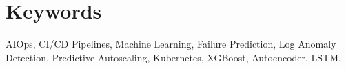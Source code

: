 \chapter*{Keywords}
AIOps, CI/CD Pipelines, Machine Learning, Failure Prediction, Log Anomaly Detection, Predictive Autoscaling, Kubernetes, XGBoost, Autoencoder, LSTM.
